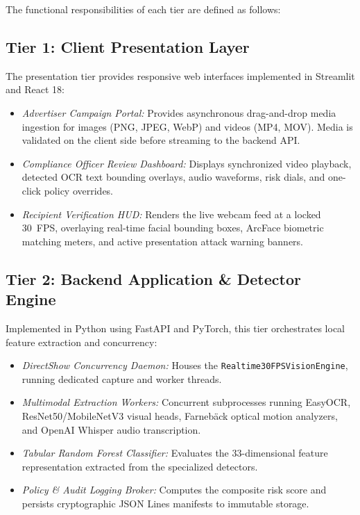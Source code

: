 \documentclass[12pt,a4paper]{report}
\begin{document}
The functional responsibilities of each tier are defined as follows:

\subsection{Tier 1: Client Presentation Layer}
The presentation tier provides responsive web interfaces implemented in Streamlit and React 18:
\begin{itemize}
    \item \emph{Advertiser Campaign Portal:} Provides asynchronous drag-and-drop media ingestion for images (PNG, JPEG, WebP) and videos (MP4, MOV). Media is validated on the client side before streaming to the backend API.
    \item \emph{Compliance Officer Review Dashboard:} Displays synchronized video playback, detected OCR text bounding overlays, audio waveforms, risk dials, and one-click policy overrides.
    \item \emph{Recipient Verification HUD:} Renders the live webcam feed at a locked 30~FPS, overlaying real-time facial bounding boxes, ArcFace biometric matching meters, and active presentation attack warning banners.
\end{itemize}

\subsection{Tier 2: Backend Application \& Detector Engine}
Implemented in Python using FastAPI and PyTorch, this tier orchestrates local feature extraction and concurrency:
\begin{itemize}
    \item \emph{DirectShow Concurrency Daemon:} Houses the \texttt{Realtime30FPSVisionEngine}, running dedicated capture and worker threads.
    \item \emph{Multimodal Extraction Workers:} Concurrent subprocesses running EasyOCR, ResNet50/MobileNetV3 visual heads, Farneb\"{a}ck optical motion analyzers, and OpenAI Whisper audio transcription.
    \item \emph{Tabular Random Forest Classifier:} Evaluates the 33-dimensional feature representation extracted from the specialized detectors.
    \item \emph{Policy \& Audit Logging Broker:} Computes the composite risk score and persists cryptographic JSON Lines manifests to immutable storage.
\end{itemize}
\end{document}

